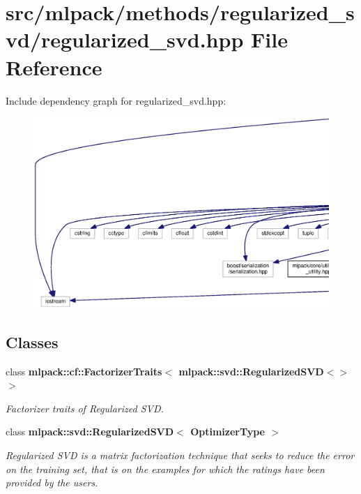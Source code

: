 \section{src/mlpack/methods/regularized\+\_\+svd/regularized\+\_\+svd.hpp File Reference}
\label{regularized__svd_8hpp}
Include dependency graph for regularized\+\_\+svd.\+hpp\+:
\nopagebreak
\begin{figure}[H]
\begin{center}
\leavevmode
\includegraphics[width=350pt]{regularized__svd_8hpp__incl}
\end{center}
\end{figure}
\subsection*{Classes}
\begin{DoxyCompactItemize}
\item 
class {\bf mlpack\+::cf\+::\+Factorizer\+Traits$<$ mlpack\+::svd\+::\+Regularized\+S\+V\+D$<$$>$ $>$}
\begin{DoxyCompactList}\small\item\em Factorizer traits of Regularized S\+VD. \end{DoxyCompactList}\item 
class {\bf mlpack\+::svd\+::\+Regularized\+S\+V\+D$<$ Optimizer\+Type $>$}
\begin{DoxyCompactList}\small\item\em Regularized S\+VD is a matrix factorization technique that seeks to reduce the error on the training set, that is on the examples for which the ratings have been provided by the users. \end{DoxyCompactList}\end{DoxyCompactItemize}
